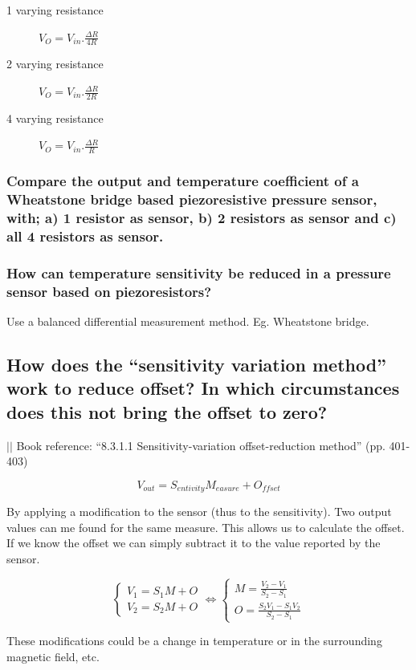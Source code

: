\documentclass[10pt,a4paper]{article}
\newcommand{\bookref}[2]{\indent\indent\indent\indent $\vert\vert$ Book reference: ``#1'' (pp. #2) \newline}
\begin{document}
\begin{description}
	\item[1 varying resistance] $V_{O} = V_{in}.\frac{\Delta R}{4R}$
	\item[2 varying resistance] $V_{O} = V_{in}.\frac{\Delta R}{2R}$
	\item[4 varying resistance] $V_{O} = V_{in}.\frac{\Delta R}{R}$
\end{description}

\subsubsection{Compare the output and temperature coefficient of a Wheatstone bridge based piezoresistive pressure sensor, with; a) 1 resistor as sensor, b) 2 resistors as sensor and c) all 4 resistors as sensor.}

\subsubsection{How can temperature sensitivity be reduced in a pressure sensor based on piezoresistors?}

Use a balanced differential measurement method. Eg. Wheatstone bridge.

\subsection{How does the ``sensitivity variation method'' work to reduce offset? In which circumstances does this not bring the offset to zero?}

\bookref{8.3.1.1 Sensitivity-variation offset-reduction method}{401-403}

\[ V_{out} = S_{entivity}M_{easure} + O_{ffset} \]

By applying a modification to the sensor (thus to the sensitivity). Two output values can me found for the same measure. This allows us to calculate the offset. If we know the offset we can simply subtract it to the value reported by the sensor.

\[
\begin{cases} V_1 = S_1M + O  \\ V_2 = S_2M+O \end{cases} \iff
\begin{cases} M = \frac{V_2-V_1}{S_2-S_1}  \\ O = \frac{S_2 V_1 - S_1 V_2}{S_2 - S_1} \end{cases} 
\]

These modifications could be a change in temperature or in the surrounding magnetic field, etc.
\end{document}
